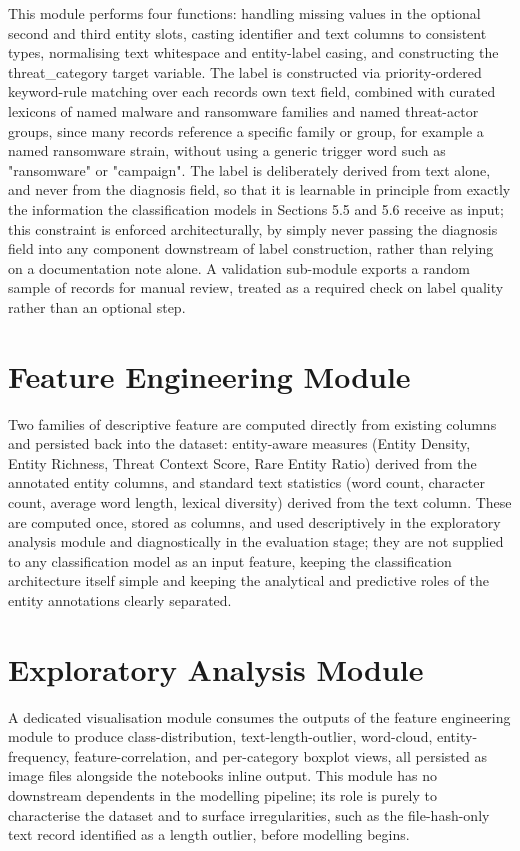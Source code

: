 \documentclass[12pt,a4paper]{report}
\begin{document}
This module performs four functions: handling missing values in the
optional second and third entity slots, casting identifier and text
columns to consistent types, normalising text whitespace and
entity-label casing, and constructing the threat\_category target
variable. The label is constructed via priority-ordered keyword-rule
matching over each record\textquotesingle s own text field, combined
with curated lexicons of named malware and ransomware families and named
threat-actor groups, since many records reference a specific family or
group, for example a named ransomware strain, without using a generic
trigger word such as "ransomware" or "campaign". The label is
deliberately derived from text alone, and never from the diagnosis
field, so that it is learnable in principle from exactly the information
the classification models in Sections 5.5 and 5.6 receive as input; this
constraint is enforced architecturally, by simply never passing the
diagnosis field into any component downstream of label construction,
rather than relying on a documentation note alone. A validation
sub-module exports a random sample of records for manual review, treated
as a required check on label quality rather than an optional step.
\section{Feature Engineering
Module}\label{feature-engineering-module}

Two families of descriptive feature are computed directly from existing
columns and persisted back into the dataset: entity-aware measures
(Entity Density, Entity Richness, Threat Context Score, Rare Entity
Ratio) derived from the annotated entity columns, and standard text
statistics (word count, character count, average word length, lexical
diversity) derived from the text column. These are computed once, stored
as columns, and used descriptively in the exploratory analysis module
and diagnostically in the evaluation stage; they are not supplied to any
classification model as an input feature, keeping the classification
architecture itself simple and keeping the analytical and predictive
roles of the entity annotations clearly separated.
\section{Exploratory Analysis
Module}\label{exploratory-analysis-module}

A dedicated visualisation module consumes the outputs of the feature
engineering module to produce class-distribution, text-length-outlier,
word-cloud, entity-frequency, feature-correlation, and per-category
boxplot views, all persisted as image files alongside the
notebook\textquotesingle s inline output. This module has no downstream
dependents in the modelling pipeline; its role is purely to characterise
the dataset and to surface irregularities, such as the file-hash-only
text record identified as a length outlier, before modelling begins.
\end{document}
